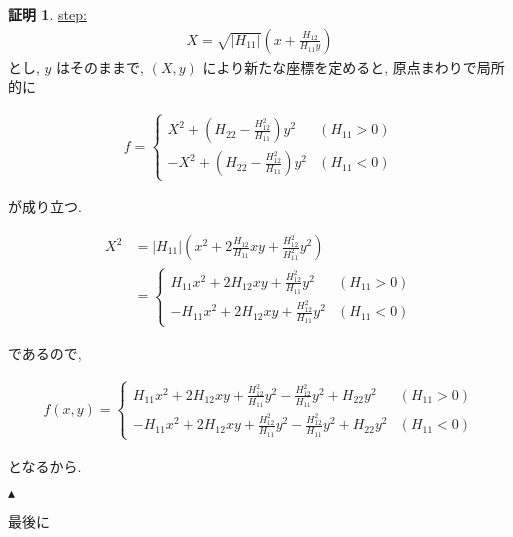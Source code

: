 \documentclass[10pt, fleqn, label-section=none]{bxjsarticle}
\theoremstyle{definition}
\newtheorem*{pf*}{証明}
\newcommand{\abs}[1]{\left|#1\right|}
\renewcommand{\;}{\, ; \,}
\newenvironment{claim}[1]{\par\noindent\underline{step:}\space#1}{}
\newenvironment{claimproof}[1]{\par\noindent{($\because$)}\space#1}{\hfill $\blacktriangle $}
\begin{document}
\begin{pf*}
\begin{claim}
\begin{align*} X = \sqrt{\abs{H_{11}}}(x + \frac{H_{12}}{H_{11} y}) \end{align*}
とし, $y$ はそのままで, $(X, y)$ 
により新たな座標を定めると, 原点まわりで局所的に

\begin{align*} f = \begin{cases} X^2 + (H_{22} - \frac{H^2_{12}}{H_11}) y^2  & (H_{11} > 0 ) \\ - X^2 + (H_{22} - \frac{H^2_{12}}{H_11}) y^2 & (H_{11} < 0 )  \end{cases}\end{align*}

が成り立つ. 


\end{claim}
\begin{claimproof}
\begin{align*} X^2 &= \abs{H_{11}} (x^2 + 2 \frac{H_{12}}{H_{11}}xy + \frac{H^2_{12}}{H^2_{11}} y^2) \\
&= \begin{cases} H_{11}x^2 + 2 H_{12} xy + \frac{H^2_{12}}{H_11} y^2  & (H_{11} > 0) \\ - H_{11}x^2 + 2 H_{12} xy + \frac{H^2_{12}}{H_11} y^2  & (H_{11} < 0) \end{cases}  \end{align*}

であるので, 

\begin{align*} f(x, y ) = \begin{cases} H_{11}x^2 + 2 H_{12} xy + \frac{H^2_{12}}{H_11} y^2 - \frac{H^2_{12}}{H_11} y^2 + H_{22} y^2   & (H_{11} > 0) \\ - H_{11}x^2 + 2 H_{12} xy + \frac{H^2_{12}}{H_11} y^2  - \frac{H^2_{12}}{H_11} y^2 + H_{22} y^2  & (H_{11} < 0) \end{cases}\end{align*}

となるから. 

\end{claimproof}

最後に


\end{pf*}
\end{document}
